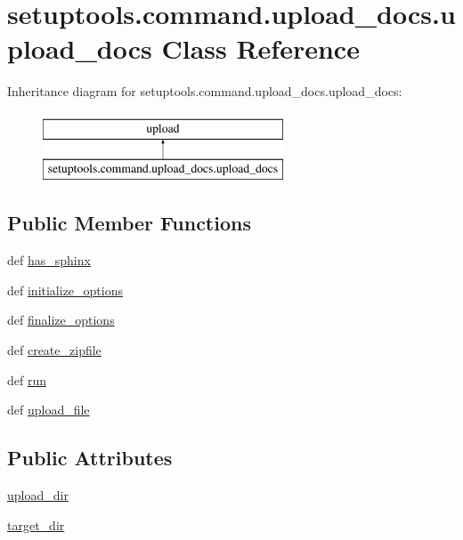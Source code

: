 \hypertarget{classsetuptools_1_1command_1_1upload__docs_1_1upload__docs}{}\section{setuptools.\+command.\+upload\+\_\+docs.\+upload\+\_\+docs Class Reference}
\label{classsetuptools_1_1command_1_1upload__docs_1_1upload__docs}
Inheritance diagram for setuptools.\+command.\+upload\+\_\+docs.\+upload\+\_\+docs\+:\begin{figure}[H]
\begin{center}
\leavevmode
\includegraphics[height=2.000000cm]{classsetuptools_1_1command_1_1upload__docs_1_1upload__docs}
\end{center}
\end{figure}
\subsection*{Public Member Functions}
\begin{DoxyCompactItemize}
\item 
def \hyperlink{classsetuptools_1_1command_1_1upload__docs_1_1upload__docs_af36802c48ef622df8d70534f0ddec4bf}{has\+\_\+sphinx}
\item 
def \hyperlink{classsetuptools_1_1command_1_1upload__docs_1_1upload__docs_a7efb766b69a99aa75524182eff1b8c21}{initialize\+\_\+options}
\item 
def \hyperlink{classsetuptools_1_1command_1_1upload__docs_1_1upload__docs_a18d90371aef7e882c7f4d55b44e3ddbf}{finalize\+\_\+options}
\item 
def \hyperlink{classsetuptools_1_1command_1_1upload__docs_1_1upload__docs_a37cc4f669dd86d4251b336f4414867b1}{create\+\_\+zipfile}
\item 
def \hyperlink{classsetuptools_1_1command_1_1upload__docs_1_1upload__docs_af5916836f60fa9ec1e34ece978e15d3c}{run}
\item 
def \hyperlink{classsetuptools_1_1command_1_1upload__docs_1_1upload__docs_a9d4e2ac321ab33e0335da3789067c364}{upload\+\_\+file}
\end{DoxyCompactItemize}
\subsection*{Public Attributes}
\begin{DoxyCompactItemize}
\item 
\hyperlink{classsetuptools_1_1command_1_1upload__docs_1_1upload__docs_ae351d8d8b61208a3bb38774ba56d99c1}{upload\+\_\+dir}
\item 
\hyperlink{classsetuptools_1_1command_1_1upload__docs_1_1upload__docs_a3e5f02483c643f4c7fec04ee49eb5d08}{target\+\_\+dir}
\end{DoxyCompactItemize}
